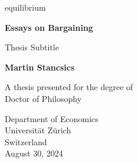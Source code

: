 equilibrium\begin{titlepage}
   \begin{center}
       \vspace*{1cm}

       \textbf{Essays on Bargaining}

       \vspace{0.5cm}
        Thesis Subtitle
            
       \vspace{1.5cm}

       \textbf{Martin Stancsics}

       \vfill
            
       A thesis presented for the degree of\\
       Doctor of Philosophy
            
       \vspace{0.8cm}

       Department of Economics\\
       Universität Zürich\\
       Switzerland\\
       August 30, 2024
            
   \end{center}
\end{titlepage}